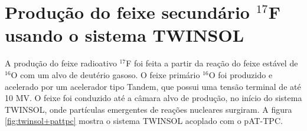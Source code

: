 \documentclass[a4paper,12pt,oneside]{book}
\begin{document}





\section{Produção do feixe secundário $^{17}$F usando o sistema TWINSOL}

\par A produção do feixe radioativo $^{17}$F foi feita a partir da reação do feixe estável de $^{16}$O com um alvo de deutério gasoso. O feixe primário $^{16}$O foi produzido e acelerado por um acelerador tipo Tandem, que possui uma tensão terminal de até 10 MV\cite{KOLATA1989503, NDtandem}. O feixe foi conduzido até a câmara alvo de produção, no início do sistema TWINSOL, onde partículas emergentes de reações nucleares surgiram. A figura \ref{fig:twinsol+pattpc} mostra o sistema TWINSOL acoplado com o pAT-TPC.
\end{document}
